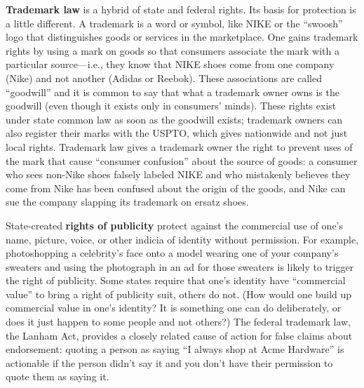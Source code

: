 \textbf{Trademark law} is a hybrid of state and federal rights. Its
basis for protection is a little different. A trademark is a word or symbol,
like NIKE or the ``swoosh'' logo that distinguishes goods or services in the
marketplace. One gains trademark rights by using a mark on goods so that
consumers associate the mark with a particular source---i.e., they know that
NIKE shoes come from one company (Nike) and not another (Adidas or Reebok).
These associations are called ``goodwill'' and it is common to say that what a
trademark owner owns is the goodwill (even though it exists only in consumers'
minds). These rights exist under state common law as soon as the goodwill
exists; trademark owners can also register their marks with the USPTO, which
gives nationwide and not just local rights. Trademark law gives a trademark
owner the right to prevent uses of the mark that cause ``consumer confusion''
about the source of goods: a consumer who sees non-Nike shoes falsely labeled
NIKE and who mistakenly believes they come from Nike has been confused about
the origin of the goods, and Nike can sue the company slapping its trademark on
ersatz shoes.

State-created \textbf{rights of publicity}
protect against the commercial use of one's
name, picture, voice, or other indicia  of identity without permission. For
example, photoshopping a celebrity's face onto a model wearing one of your
company's sweaters and using the photograph in an ad for those sweaters is
likely to trigger the right of publicity. Some states require that one's
identity have ``commercial value'' to bring a right of publicity suit, others
do not. (How would one build up commercial value in one's identity? It is
something one can do deliberately, or does it just happen to some people and
not others?) The federal trademark law, the Lanham Act, provides a closely
related cause of action for false claims about endorsement: quoting a person as
saying ``I always shop at Acme Hardware'' is actionable if the person didn't
say it and you don't have their permission to quote them as saying it.


